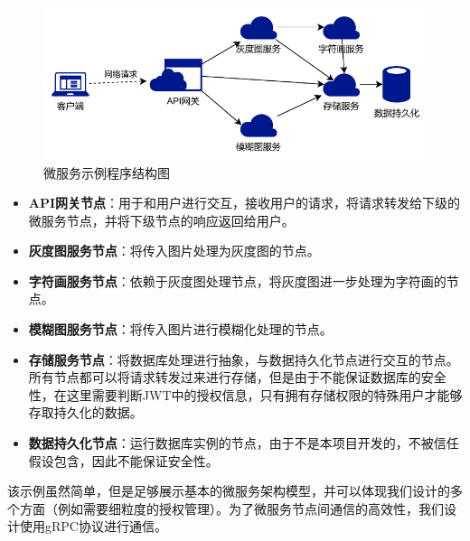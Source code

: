 \begin{figure}[!ht]
    \centering
    \includegraphics[width=.7\textwidth]{figures/msdemo.pdf}
    \caption{微服务示例程序结构图}
    \label{fig:ms-demo}
\end{figure}

\begin{itemize}
    \item \textbf{API网关节点}：用于和用户进行交互，接收用户的请求，将请求转发给下级的微服务节点，并将下级节点的响应返回给用户。
    \item \textbf{灰度图服务节点}：将传入图片处理为灰度图的节点。
    \item \textbf{字符画服务节点}：依赖于灰度图处理节点，将灰度图进一步处理为字符画的节点。
    \item \textbf{模糊图服务节点}：将传入图片进行模糊化处理的节点。
    \item \textbf{存储服务节点}：将数据库处理进行抽象，与数据持久化节点进行交互的节点。所有节点都可以将请求转发过来进行存储，但是由于不能保证数据库的安全性，在这里需要判断JWT中的授权信息，只有拥有存储权限的特殊用户才能够存取持久化的数据。
    \item \textbf{数据持久化节点}：运行数据库实例的节点，由于不是本项目开发的，不被信任假设包含，因此不能保证安全性。
\end{itemize}

该示例虽然简单，但是足够展示基本的微服务架构模型，并可以体现我们设计的多个方面（例如需要细粒度的授权管理）。为了微服务节点间通信的高效性，我们设计使用gRPC协议进行通信。
